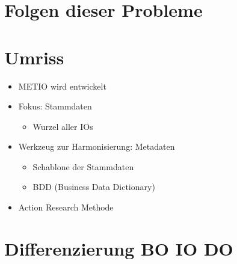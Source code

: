 \documentclass[11pt, aspectratio=169]{beamer}
\begin{document}
\section{Folgen dieser Probleme}
\begin{frame}[t, fragile]
\end{frame}

\section{Umriss}
\begin{frame}[t, fragile]
  \begin{itemize}
  \item METIO wird entwickelt    
  
  \item Fokus: Stammdaten
      \begin{itemize}
      \item Wurzel aller IOs
      \end{itemize}
      
  \item Werkzeug zur Harmonisierung: Metadaten
      \begin{itemize}
      \item Schablone der Stammdaten
      \item BDD (Business Data Dictionary)
      \end{itemize}

  \item Action Research Methode
  \end{itemize}
\end{frame}

\section{Differenzierung BO IO DO}
\end{document}
